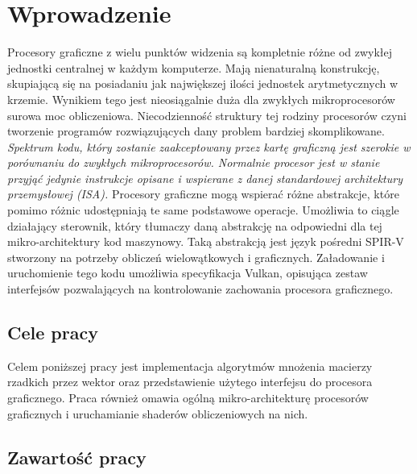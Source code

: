 \chapter{Wprowadzenie}
\label{cha:wprowadzenie}

Procesory graficzne z wielu punktów widzenia są kompletnie różne od zwykłej jednostki centralnej w każdym komputerze.
Mają nienaturalną konstrukcję, skupiającą się na posiadaniu jak największej ilości jednostek arytmetycznych w krzemie.
Wynikiem tego jest nieosiągalnie duża dla zwykłych mikroprocesorów surowa moc obliczeniowa.
Niecodzienność struktury tej rodziny procesorów czyni tworzenie programów rozwiązujących dany problem bardziej skomplikowane.
\emph{Spektrum kodu, który zostanie zaakceptowany przez kartę graficzną jest szerokie w porównaniu do zwykłych mikroprocesorów.
Normalnie procesor jest w stanie przyjąć jedynie instrukcje opisane i wspierane z danej standardowej architektury przemysłowej (ISA).
}
Procesory graficzne mogą wspierać różne abstrakcje, które pomimo różnic udostępniają te same podstawowe operacje.
Umożliwia to ciągle działający sterownik, który tłumaczy daną abstrakcję na odpowiedni dla tej mikro-architektury kod maszynowy.
Taką abstrakcją jest język pośredni SPIR-V stworzony na potrzeby obliczeń wielowątkowych i graficznych.
Załadowanie i uruchomienie tego kodu umożliwia specyfikacja Vulkan, opisująca zestaw interfejsów pozwalających na kontrolowanie zachowania procesora graficznego.


\section{Cele pracy}
\label{sec:celePracy}

Celem poniższej pracy jest implementacja algorytmów mnożenia macierzy rzadkich przez wektor oraz przedstawienie użytego interfejsu do procesora graficznego. Praca również omawia ogólną mikro-architekturę procesorów graficznych i uruchamianie shaderów obliczeniowych na nich.


\section{Zawartość pracy}
\label{sec:zawartoscPracy}

